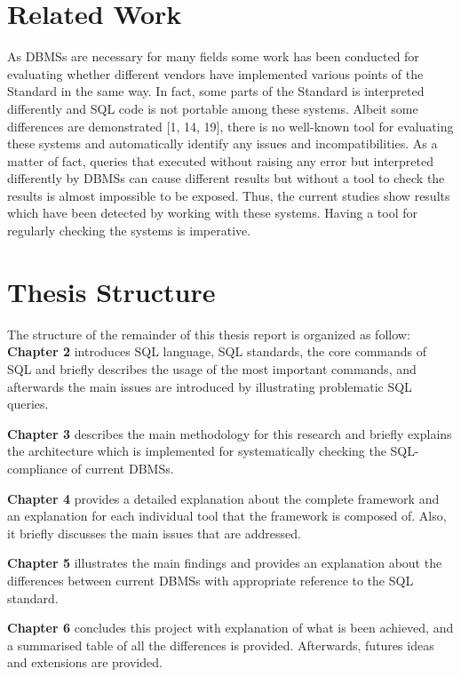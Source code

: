 \section{Related Work}
As DBMSs are necessary for many fields some work has been conducted for evaluating whether different vendors have implemented various points of the Standard in the same way. In fact, some parts of the Standard is interpreted differently and SQL code is not portable among these systems. Albeit some differences are demonstrated [1, 14, 19], there is no well-known tool for evaluating these systems and automatically identify any issues and incompatibilities. As a matter of fact, queries that executed without raising any error but interpreted differently by DBMSs can cause different results but without a tool to check the results is almost impossible to be exposed.  Thus, the current studies show results which have been detected by working with these systems. Having a tool for regularly checking the systems is imperative.  


 
 \section{Thesis Structure}

The structure of the remainder of this thesis report is organized as follow: \textbf{Chapter 2} introduces SQL language, SQL standards, the core commands of SQL and briefly describes the usage of the most important commands, and afterwards the main issues are introduced by illustrating problematic SQL queries. 

 \textbf{Chapter 3} describes the main methodology for this research and briefly explains the architecture which is implemented for systematically checking the SQL-compliance of current DBMSs.

 \textbf{Chapter 4} provides a detailed explanation about the complete framework and an explanation for each individual tool that the framework is composed of. Also, it briefly discusses the main issues that  are  addressed.

 \textbf{Chapter 5} illustrates the main findings and provides an explanation about the differences between current DBMSs with appropriate reference to the SQL standard. 

 \textbf{Chapter 6} concludes this project with explanation of what is been achieved, and a summarised table of all the differences is provided. Afterwards, futures ideas and extensions are provided.  


 
 

